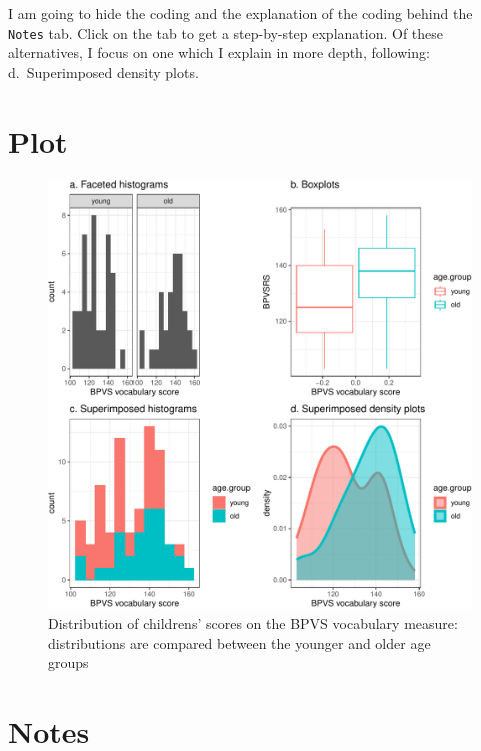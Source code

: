 \documentclass[
  letterpaper,
  DIV=11,
  numbers=noendperiod]{scrreprt}
\begin{document}
I am going to hide the coding and the explanation of the coding behind
the \texttt{Notes} tab. Click on the tab to get a step-by-step
explanation. Of these alternatives, I focus on one which I explain in
more depth, following: d.~Superimposed density plots.

\section{Plot}

\begin{figure}

{\centering \includegraphics{visualization_files/figure-pdf/fig-distribution-comparison-grid-1.pdf}

}

\caption{\label{fig-distribution-comparison-grid}Distribution of
childrens' scores on the BPVS vocabulary measure: distributions are
compared between the younger and older age groups}

\end{figure}

\section{Notes}
\end{document}
